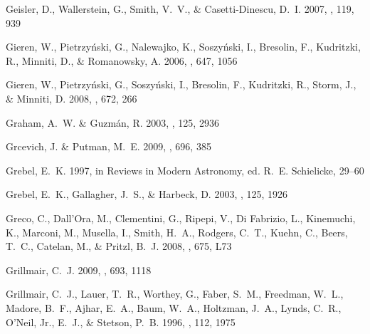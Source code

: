 \documentclass[manuscript]{aastex}
\begin{document}
\begin{thebibliography}{381}
{Geisler}, D., {Wallerstein}, G., {Smith}, V.~V., \& {Casetti-Dinescu}, D.~I.
  2007, \pasp, 119, 939

{Gieren}, W., {Pietrzy{\'n}ski}, G., {Nalewajko}, K., {Soszy{\'n}ski}, I.,
  {Bresolin}, F., {Kudritzki}, R., {Minniti}, D., \& {Romanowsky}, A. 2006,
  \apj, 647, 1056

{Gieren}, W., {Pietrzy{\'n}ski}, G., {Soszy{\'n}ski}, I., {Bresolin}, F.,
  {Kudritzki}, R., {Storm}, J., \& {Minniti}, D. 2008, \apj, 672, 266

{Graham}, A.~W. \& {Guzm{\'a}n}, R. 2003, \aj, 125, 2936

{Grcevich}, J. \& {Putman}, M.~E. 2009, \apj, 696, 385

{Grebel}, E.~K. 1997, in Reviews in Modern Astronomy, ed. R.~E. {Schielicke},
  29--60

{Grebel}, E.~K., {Gallagher}, J.~S., \& {Harbeck}, D. 2003, \aj, 125, 1926

{Greco}, C., {Dall'Ora}, M., {Clementini}, G., {Ripepi}, V., {Di Fabrizio}, L.,
  {Kinemuchi}, K., {Marconi}, M., {Musella}, I., {Smith}, H.~A., {Rodgers},
  C.~T., {Kuehn}, C., {Beers}, T.~C., {Catelan}, M., \& {Pritzl}, B.~J. 2008,
  \apjl, 675, L73

{Grillmair}, C.~J. 2009, \apj, 693, 1118

{Grillmair}, C.~J., {Lauer}, T.~R., {Worthey}, G., {Faber}, S.~M., {Freedman},
  W.~L., {Madore}, B.~F., {Ajhar}, E.~A., {Baum}, W.~A., {Holtzman}, J.~A.,
  {Lynds}, C.~R., {O'Neil}, Jr., E.~J., \& {Stetson}, P.~B. 1996, \aj, 112,
  1975


\end{thebibliography}
\end{document}
